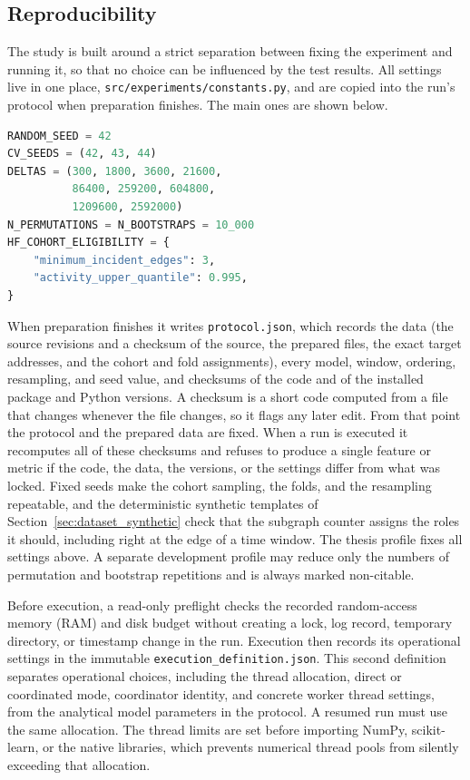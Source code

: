 \subsection{Reproducibility}

The study is built around a strict separation between fixing the experiment and
running it, so that no choice can be influenced by the test results. All settings live
in one place, \texttt{src/experiments/constants.py}, and are copied into the run's
protocol when preparation finishes. The main ones are shown below.

\begin{lstlisting}[language=Python,
  caption={Selected fixed experiment settings.},
  label={lst:config}]
RANDOM_SEED = 42
CV_SEEDS = (42, 43, 44)
DELTAS = (300, 1800, 3600, 21600,
          86400, 259200, 604800,
          1209600, 2592000)
N_PERMUTATIONS = N_BOOTSTRAPS = 10_000
HF_COHORT_ELIGIBILITY = {
    "minimum_incident_edges": 3,
    "activity_upper_quantile": 0.995,
}
\end{lstlisting}

When preparation finishes it writes \texttt{protocol.json}, which records the data
(the source revisions and a checksum of the source, the prepared files, the exact
target addresses, and the cohort and fold assignments), every model, window,
ordering, resampling, and seed value, and checksums of the code and of the
installed package and Python versions. A checksum is a short code computed from a
file that changes whenever the file changes, so it flags any later edit. From that
point the protocol and the prepared data are fixed. When a run is executed it
recomputes all of these checksums and refuses to produce a single feature or metric
if the code, the data, the versions, or the settings differ from what was locked. Fixed seeds make
the cohort sampling, the folds, and the resampling repeatable, and the
deterministic synthetic templates of Section~\ref{sec:dataset_synthetic} check that
the subgraph counter assigns the roles it should, including right at the edge of a
time window. The thesis profile fixes all settings above. A separate development
profile may reduce only the numbers of permutation and bootstrap repetitions and
is always marked non-citable.

Before execution, a read-only preflight checks the recorded random-access memory
(RAM) and disk budget
without creating a lock, log record, temporary directory, or timestamp change in
the run. Execution then records its operational settings in the immutable
\texttt{execution\_\allowbreak definition.json}. This second definition separates operational
choices, including the thread allocation, direct or coordinated mode, coordinator
identity, and concrete worker thread settings, from the analytical model
parameters in the protocol. A resumed run must use the same allocation. The
thread limits are set before importing NumPy, scikit-learn, or the native
libraries, which prevents numerical thread pools from silently exceeding that
allocation.

